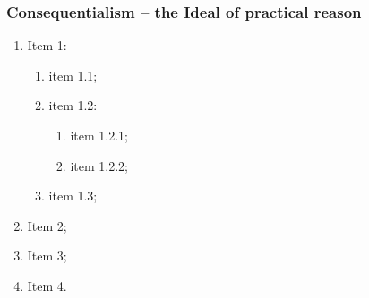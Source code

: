 \subsubsection{Consequentialism -- the Ideal of practical reason}
\kant[3]
\begin{enumerate}
    \item Item 1:
    \begin{enumerate}
        \item item 1.1;
        \item item 1.2:
        \begin{enumerate}
            \item item 1.2.1;
            \item item 1.2.2;
        \end{enumerate}
        \item item 1.3;
    \end{enumerate}
    \item Item 2;
    \item Item 3;
    \item Item 4.
\end{enumerate}

\kant[9]

